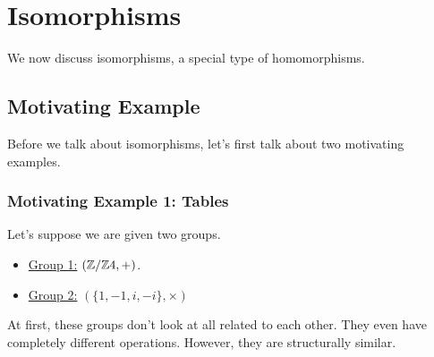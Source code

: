\documentclass[letterpaper]{article}
\begin{document}
\newpage 
\section{Isomorphisms}
We now discuss isomorphisms, a special type of homomorphisms.

\subsection{Motivating Example}
Before we talk about isomorphisms, let's first talk about two motivating examples. 

\subsubsection{Motivating Example 1: Tables}
Let's suppose we are given two groups.
\begin{itemize}
    \item \underline{Group 1:} $(\mathbb{Z} / \mathbb{Z} 4, +)$. 
    \item \underline{Group 2:} $(\{1, -1, i, -i\}, \times)$
\end{itemize}
At first, these groups don't look at all related to each other. They even have completely different operations. However, they are structurally similar. 

\bigskip 
\end{document}
